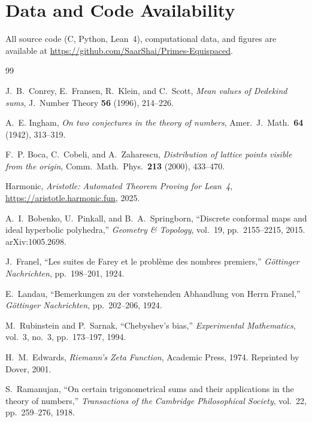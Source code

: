 \documentclass[11pt]{article}
\theoremstyle{definition}
\begin{document}
\section*{Data and Code Availability}

All source code (C, Python, Lean~4), computational data, and
figures are available at
\url{https://github.com/SaarShai/Primes-Equispaced}.


\FloatBarrier
\begin{thebibliography}{99}

J.~B.~Conrey, E.~Fransen, R.~Klein, and C.~Scott,
\emph{Mean values of Dedekind sums},
J.\ Number Theory \textbf{56} (1996), 214--226.


A.~E. Ingham,
\emph{On two conjectures in the theory of numbers},
Amer.\ J.\ Math.\ \textbf{64} (1942), 313--319.

F.~P. Boca, C.~Cobeli, and A.~Zaharescu,
\emph{Distribution of lattice points visible from the origin},
Comm.\ Math.\ Phys.\ \textbf{213} (2000), 433--470.

Harmonic,
\emph{Aristotle: Automated Theorem Proving for Lean~4},
\url{https://aristotle.harmonic.fun}, 2025.

A.~I.~Bobenko, U.~Pinkall, and B.~A.~Springborn,
``Discrete conformal maps and ideal hyperbolic polyhedra,''
\emph{Geometry \& Topology}, vol.~19, pp.~2155--2215, 2015.
arXiv:1005.2698.

J.~Franel,
``Les suites de Farey et le probl\`eme des nombres premiers,''
\emph{G\"ottinger Nachrichten}, pp.~198--201, 1924.

E.~Landau,
``Bemerkungen zu der vorstehenden Abhandlung von Herrn Franel,''
\emph{G\"ottinger Nachrichten}, pp.~202--206, 1924.

M.~Rubinstein and P.~Sarnak,
``Chebyshev's bias,''
\emph{Experimental Mathematics}, vol.~3, no.~3, pp.~173--197, 1994.


H.~M.~Edwards,
\emph{Riemann's Zeta Function},
Academic Press, 1974.
Reprinted by Dover, 2001.

S.~Ramanujan,
``On certain trigonometrical sums and their applications in the
theory of numbers,''
\emph{Transactions of the Cambridge Philosophical Society},
vol.~22, pp.~259--276, 1918.


\end{thebibliography}
\end{document}
